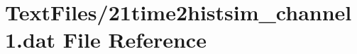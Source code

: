 \hypertarget{21time2histsim__channel1_8dat}{}\section{Text\+Files/21time2histsim\+\_\+channel1.dat File Reference}
\label{21time2histsim__channel1_8dat}
